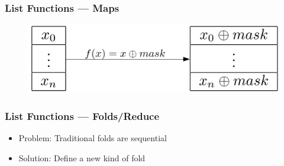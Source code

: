 \documentclass{beamer}
\begin{document}
\begin{frame}
    \frametitle{List Functions --- Maps}
    
    
    \begin{figure}
        \includegraphics[keepaspectratio=true,scale=0.25]{src/map.png}
    \end{figure}
\end{frame}


\begin{frame}[t]
    \frametitle{List Functions --- Folds/Reduce}
    \begin{itemize}
        \item Problem:  Traditional folds are sequential
        \item Solution: Define a new kind of fold
    \end{itemize}

    \begin{small}
    \end{small}


\end{frame}
\end{document}
